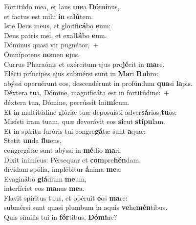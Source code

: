 \evenverse Fortitúdo mea, et laus \textbf{me}a \textbf{Dó}\textbf{mi}nus,~\*\\
\evenverse et factus est mihi \textbf{in} sa\textbf{lú}tem.\\
\oddverse Iste Deus meus, et glorifi\textbf{cá}bo \textbf{e}um:~\*\\
\oddverse Deus patris mei, et exal\textbf{tá}bo \textbf{e}um.\\
\evenverse Dóminus quasi vir pugnátor,~+\\
\evenverse  Omnípotens \textbf{no}men \textbf{e}jus.~\*\\
\evenverse Currus Pharaónis et exércitum ejus pro\textbf{jé}cit in \textbf{ma}re.\\
\oddverse Elécti príncipes ejus submérsi sunt in \textbf{Ma}ri \textbf{Ru}bro:~\*\\
\oddverse abýssi operuérunt eos, descendérunt in profúndum \textbf{qua}si \textbf{la}pis.\\
\evenverse Déxtera tua, Dómine, magnificáta est in fortitúdine:~+\\
\evenverse  déxtera tua, Dómine, percússit \textbf{i}ni\textbf{mí}cum.~\*\\
\evenverse Et in multitúdine glóriæ tuæ deposuísti adver\textbf{sá}rios \textbf{tu}os:\\
\oddverse Misísti iram tuam, quæ devorávit eos \textbf{si}cut \textbf{stí}\textbf{pu}lam.~\*\\
\oddverse Et in spíritu furóris tui congre\textbf{gá}tæ sunt \textbf{a}quæ:\\
\evenverse Stetit \textbf{un}da \textbf{flu}ens,~\*\\
\evenverse congregátæ sunt abýssi in \textbf{mé}dio \textbf{ma}ri.\\
\oddverse Dixit inimícus: Pérsequar et \textbf{com}pre\textbf{hén}dam,~\*\\
\oddverse dívidam spólia, implébitur \textbf{á}nima \textbf{me}a:\\
\evenverse Evaginábo \textbf{glá}dium \textbf{me}um,~\*\\
\evenverse interfíciet eos \textbf{ma}nus \textbf{me}a.\\
\oddverse Flavit spíritus tuus, et opéruit \textbf{e}os \textbf{ma}re:~\*\\
\oddverse submérsi sunt quasi plumbum in aquis \textbf{ve}he\textbf{mén}tibus.\\
\evenverse Quis símilis tui in \textbf{fór}tibus, \textbf{Dó}\textbf{mi}ne?~\*\\
